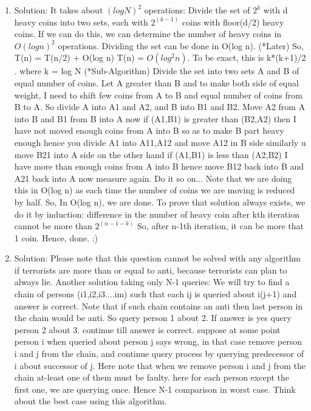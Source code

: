 \begin{enumerate}
\item
Solution: It takes about $(log N)^2$ operations:
Divide the set of $2^k$ with d heavy coins into two sets, each with $2^(k-1)$ coins with floor(d/2) heavy coins. If we can do this, we can determine the number of heavy coins in $O(log n)^2$ operations.
Dividing the set can be done in O(log n). (*Later)
So, T(n) = T(n/2) + O(log n)
T(n) = $O(log^2 n)$.
To be exact, this is k*(k+1)/2 . where k = log N
(*Sub-Algorithm)
Divide the set into two sets A and B of equal number of coins. Let A greater than B and to make both side of equal weight, I need to shift few coins from A to B and equal number of coins from B to A. So divide A into A1 and A2, and B into B1 and B2. Move A2 from A into B and B1 from B into A now if (A1,B1) is greater than (B2,A2) then I have not moved enough coins from A into B so as to make B part heavy enough hence you divide A1 into A11,A12 and move A12 in B side similarly u move B21 into A side on the other hand if (A1,B1) is less than (A2,B2) I have more than enough coins from A into B hence move B12 back into B and A21 back into A now measure again. Do it so on...
Note that we are doing this in O(log n) as each time the number of coins we are moving is reduced by half. So, In O(log n), we are done.
To prove that solution always exists, we do it by induction:
difference in the number of heavy coin after kth iteration cannot be more than $2^(n-1-k)$
So, after n-1th iteration, it can be more that 1 coin. Hence, done. :)




\item
Solution: Please note that this question cannot be solved with any algorithm if terrorists are more than or equal to anti, because terrorists can plan to always lie.
Another solution taking only N-1 queries:
We will try to find a chain of persons (i1,i2,i3....im) such that each ij is queried about i(j+1) and answer is correct. Note that if such chain contains an anti then last person in the chain would be anti. So query person 1 about 2. If answer is yes query person 2 about 3. continue till answer is correct. suppose at some point person i when queried about person j says wrong, in that case remove person i and j from the chain, and continue query process by querying predecessor of i about successor of j. Here note that when we remove person i and j from the chain at-least one of them must be faulty. here for each person except the first one, we are querying once. Hence N-1 comparison in worst case. Think about the best case using this algorithm.




\end{enumerate}
